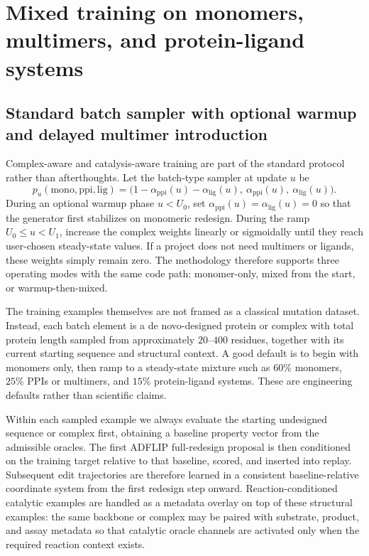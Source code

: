 \documentclass[11pt]{article}
\begin{document}
	
	\section{Mixed training on monomers, multimers, and protein-ligand systems}
	\label{sec:mixedtraining}
	
	
	\subsection{Standard batch sampler with optional warmup and delayed multimer introduction}
	
	Complex-aware and catalysis-aware training are part of the standard protocol rather than afterthoughts. Let the batch-type sampler at update $u$ be
	\begin{equation}
		p_u(\mathrm{mono},\mathrm{ppi},\mathrm{lig}) = \big(1-\alpha_{\mathrm{ppi}}(u)-\alpha_{\mathrm{lig}}(u),\ \alpha_{\mathrm{ppi}}(u),\ \alpha_{\mathrm{lig}}(u)\big).
	\end{equation}
	During an optional warmup phase $u<U_0$, set $\alpha_{\mathrm{ppi}}(u)=\alpha_{\mathrm{lig}}(u)=0$ so that the generator first stabilizes on monomeric redesign. During the ramp $U_0\le u < U_1$, increase the complex weights linearly or sigmoidally until they reach user-chosen steady-state values. If a project does not need multimers or ligands, these weights simply remain zero. The methodology therefore supports three operating modes with the same code path: monomer-only, mixed from the start, or warmup-then-mixed.
	
	The training examples themselves are not framed as a classical mutation dataset. Instead, each batch element is a de novo-designed protein or complex with total protein length sampled from approximately $20$--$400$ residues, together with its current starting sequence and structural context. A good default is to begin with monomers only, then ramp to a steady-state mixture such as $60\%$ monomers, $25\%$ PPIs or multimers, and $15\%$ protein-ligand systems. These are engineering defaults rather than scientific claims.
	
	Within each sampled example we always evaluate the starting undesigned sequence or complex first, obtaining a baseline property vector from the admissible oracles. The first ADFLIP full-redesign proposal is then conditioned on the training target relative to that baseline, scored, and inserted into replay. Subsequent edit trajectories are therefore learned in a consistent baseline-relative coordinate system from the first redesign step onward. Reaction-conditioned catalytic examples are handled as a metadata overlay on top of these structural examples: the same backbone or complex may be paired with substrate, product, and assay metadata so that catalytic oracle channels are activated only when the required reaction context exists.
	
\end{document}
